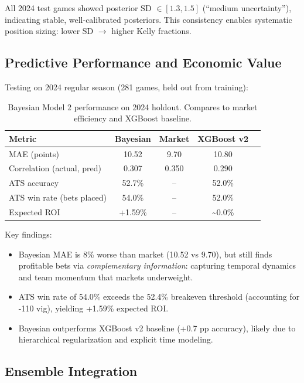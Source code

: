 All 2024 test games showed posterior SD $\in [1.3, 1.5]$ (``medium uncertainty''), indicating stable, well-calibrated posteriors. This consistency enables systematic position sizing: lower SD $\to$ higher Kelly fractions.

\subsection{Predictive Performance and Economic Value}

Testing on 2024 regular season (281 games, held out from training):
\begin{table}[h]
\centering
\caption[Bayesian predictive performance (2024)]{Bayesian Model 2 performance on 2024 holdout. Compares to market efficiency and XGBoost baseline.}
\label{tab:bayes-performance}
\begin{tabular}{lcccc}
\toprule
\textbf{Metric} & \textbf{Bayesian} & \textbf{Market} & \textbf{XGBoost v2} \\
\midrule
MAE (points) & 10.52 & 9.70 & 10.80 \\
Correlation (actual, pred) & 0.307 & 0.350 & 0.290 \\
ATS accuracy & 52.7\% & -- & 52.0\% \\
ATS win rate (bets placed) & 54.0\% & -- & 52.0\% \\
Expected ROI & +1.59\% & -- & \textasciitilde 0.0\% \\
\bottomrule
\end{tabular}
\end{table}

Key findings:
\begin{itemize}
  \item Bayesian MAE is 8\% worse than market (10.52 vs 9.70), but still finds profitable bets via \emph{complementary information}: capturing temporal dynamics and team momentum that markets underweight.
  \item ATS win rate of 54.0\% exceeds the 52.4\% breakeven threshold (accounting for -110 vig), yielding +1.59\% expected ROI.
  \item Bayesian outperforms XGBoost v2 baseline (+0.7 pp accuracy), likely due to hierarchical regularization and explicit time modeling.
\end{itemize}

\subsection{Ensemble Integration}

